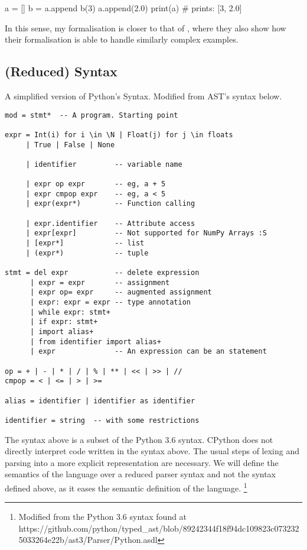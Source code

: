 \begin{pythoncode}
a = []
b = a.append
b(3)
a.append(2.0)
print(a)  # prints: [3, 2.0]
\end{pythoncode}

In this sense, my formalisation is closer to that of
\textcite{politz_python_2013}, where they also show how their
formalisation is able to handle similarly complex examples.

\subsection{(Reduced) Syntax}\label{reduced-syntax}

A simplified version of Python's Syntax. Modified from AST's syntax
below.

{}

\begin{verbatim}
mod = stmt*  -- A program. Starting point

expr = Int(i) for i \in \N | Float(j) for j \in floats
     | True | False | None

     | identifier         -- variable name

     | expr op expr       -- eg, a + 5
     | expr cmpop expr    -- eg, a < 5
     | expr(expr*)        -- Function calling

     | expr.identifier    -- Attribute access
     | expr[expr]         -- Not supported for NumPy Arrays :S
     | [expr*]            -- list
     | (expr*)            -- tuple

stmt = del expr           -- delete expression
      | expr = expr       -- assignment
      | expr op= expr     -- augmented assignment
      | expr: expr = expr -- type annotation
      | while expr: stmt+
      | if expr: stmt+
      | import alias+
      | from identifier import alias+
      | expr              -- An expression can be an statement

op = + | - | * | / | % | ** | << | >> | //
cmpop = < | <= | > | >=

alias = identifier | identifier as identifier

identifier = string  -- with some restrictions
\end{verbatim}

The syntax above is a subset of the Python 3.6 syntax. CPython does not
directly interpret code written in the syntax above. The usual steps of
lexing and parsing into a more explicit representation are necessary. We
will define the semantics of the language over a reduced parser syntax
and not the syntax defined above, as it eases the semantic definition of
the language. \footnote{Modified from the Python 3.6 syntax found at
  https://github.com/python/typed\_ast/blob/89242344f18f94dc109823c0732325033264e22b/ast3/Parser/Python.asdl}

